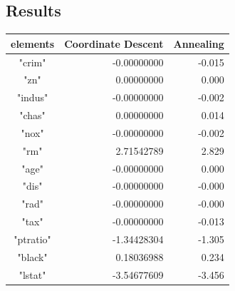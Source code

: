 \documentclass[fp,twocolumn]{jpsj3}
\begin{document}
\subsection{Results}
\begin{table}
  \begin{tabular}{|c||r|r|} \hline
    elements  & Coordinate Descent & Annealing \\ \hline
    "crim"    & -0.00000000 & -0.015 \\
    "zn"      &  0.00000000 &  0.000 \\
    "indus"   & -0.00000000 & -0.002 \\
    "chas"    &  0.00000000 &  0.014 \\
    "nox"     & -0.00000000 & -0.002 \\
    "rm"      &  2.71542789 &  2.829 \\
    "age"     & -0.00000000 &  0.000 \\
    "dis"     & -0.00000000 & -0.000 \\
    "rad"     & -0.00000000 & -0.000 \\
    "tax"     & -0.00000000 & -0.013 \\
    "ptratio" & -1.34428304 & -1.305 \\
    "black"   &  0.18036988 &  0.234 \\
    "lstat"   & -3.54677609 & -3.456 \\ \hline
  \end{tabular}
\end{table}

\begin{acknowledgment}



\end{acknowledgment}

\end{document}
